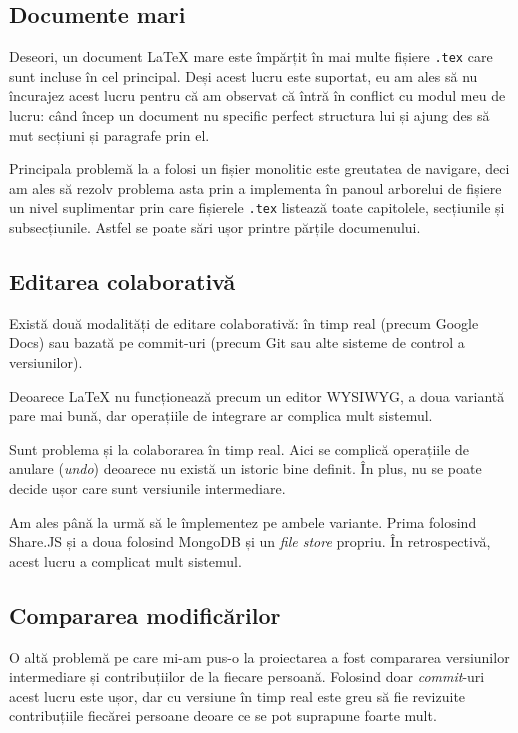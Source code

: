 \documentclass[a4wide,12pt]{report}
\newcommand{\eng}[1]{\emph{#1}} %
\newcommand{\cod}[1]{\texttt{#1}}
\begin{document}
\subsection{Documente mari}

Deseori, un document \LaTeX{} mare este împărțit în mai multe fișiere \cod{.tex}
care sunt incluse în cel principal. Deși acest lucru este suportat, eu am ales
să nu încurajez acest lucru pentru că am observat că întră în conflict cu modul
meu de lucru: când încep un document nu specific perfect structura lui și ajung
des să mut secțiuni și paragrafe prin el.

Principala problemă la a folosi un fișier monolitic este greutatea de navigare,
deci am ales să rezolv problema asta prin a implementa în panoul arborelui de
fișiere un nivel suplimentar prin care fișierele \cod{.tex} listează toate
capitolele, secțiunile și subsecțiunile. Astfel se poate sări ușor printre
părțile documenului.

\subsection{Editarea colaborativă}

Există două modalități de editare colaborativă: în timp real (precum Google
Docs) sau bazată pe commit-uri (precum Git sau alte sisteme de control a
versiunilor).

Deoarece \LaTeX{} nu funcționează precum un editor WYSIWYG, a doua variantă pare
mai bună, dar operațiile de integrare ar complica mult sistemul.

Sunt problema și la colaborarea în timp real. Aici se complică operațiile de
anulare (\eng{undo}) deoarece nu există un istoric bine definit. În plus, nu se
poate decide ușor care sunt versiunile intermediare.

Am ales până la urmă să le împlementez pe ambele variante. Prima folosind
Share.JS și a doua folosind MongoDB și un \eng{file store} propriu. În
retrospectivă, acest lucru a complicat mult sistemul.

\subsection{Compararea modificărilor}

O altă problemă pe care mi-am pus-o la proiectarea a fost compararea versiunilor
intermediare și contribuțiilor de la fiecare persoană. Folosind doar
\eng{commit}-uri acest lucru este ușor, dar cu versiune în timp real este greu
să fie revizuite contribuțiile fiecărei persoane deoare ce se pot suprapune
foarte mult.
\end{document}
